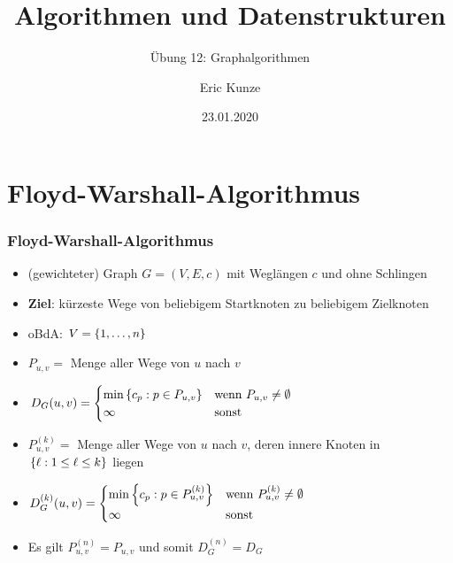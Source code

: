 \documentclass{beamer}
\begin{document}
	
	\title{Algorithmen und Datenstrukturen}
	\subtitle{Übung 12: Graphalgorithmen}
	\author{Eric Kunze}
	\date{23.01.2020}

	\maketitle


\section{Floyd-Warshall-Algorithmus}

\begin{frame} \frametitle{Floyd-Warshall-Algorithmus}
	\begin{itemize}
		\item (gewichteter) Graph $G = (V,E,c)$ mit Weglängen $c$ und ohne Schlingen
		\item \textbf{Ziel}: kürzeste Wege von beliebigem Startknoten zu beliebigem Zielknoten
		\item oBdA: $V = \left\{ 1, \dots, n \right\}$
		\item $P_{u,v} =$ Menge aller Wege von $u$ nach $v$
		\item $D_G (u,v) = \begin{cases}
		\min\left\{ c_p : p \in P_{u,v} \right\} & \text{wenn } P_{u,v} \neq \emptyset \\
		\infty & \text{sonst}
		\end{cases}$
		\item $P^{(k)}_{u,v} =$ Menge aller Wege von $u$ nach $v$, deren innere Knoten in $\left\{ \ell : 1 \le \ell \le k \right\}$ liegen
		\item $D_G^{(k)} (u,v) = \begin{cases}
		\min\left\{ c_p : p \in P_{u,v}^{(k)} \right\} & \text{wenn } P_{u,v}^{(k)} \neq \emptyset \\
		\infty & \text{sonst}
		\end{cases}$
		\item Es gilt $P^{(n)}_{u,v} = P_{u,v}$ und somit $D_G^{(n)} = D_G$
	\end{itemize}
\end{frame}
\end{document}
